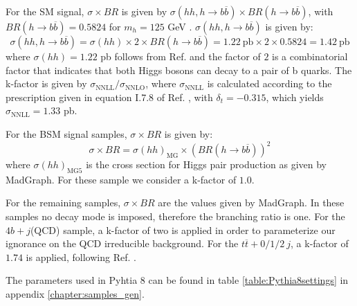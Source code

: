 For the SM signal, $\sigma\times BR$ is given by $\sigma(hh,h\rightarrow b\overline{b})\times BR(h\rightarrow b\overline{b})$, with $BR(h\rightarrow b\overline{b})=0.5824$ for $m_h=125$ GeV \cite{HiggsHandbook}. $\sigma(hh,h\rightarrow b\overline{b})$ is given by:
\begin{equation}
	\sigma(hh,h\rightarrow b\overline{b})=\sigma(hh)\times 2\times BR(h\rightarrow b\overline{b})=1.22~\text{pb}\times 2 \times 0.5824 = 1.42 ~\text{pb}
\end{equation}
where $\sigma(hh)=1.22$ pb follows from Ref. \cite{HxsNNLO} and the factor of $2$ is a combinatorial factor that indicates that both Higgs bosons can decay to a pair of b quarks. The k-factor is given by $\sigma_{\text{NNLL}}/\sigma_{\text{NNLO}}$, where $\sigma_{\text{NNLL}}$ is calculated according to the prescription given in equation I.7.8 of Ref. \cite{HiggsHandbook}, with $\delta_t=-0.315$, which yields $\sigma_{\text{NNLL}}=1.33$ pb.

For the BSM signal samples, $\sigma\times BR$ is given by:
\begin{equation}
	\sigma\times BR = \sigma(hh)_{\text{MG}}\times (BR(h\rightarrow b\overline{b}))^2
\end{equation}
where $\sigma(hh)_{\text{MG5}}$ is the cross section for Higgs pair production as given by MadGraph. For these sample we consider a k-factor of $1.0$.

For the remaining samples, $\sigma\times BR$ are the values given by MadGraph. In these samples no decay mode is imposed, therefore the branching ratio is one. For the $4b+j$(QCD) sample, a k-factor of two is applied \cite{FCCEventProducer} in order to parameterize our ignorance on the QCD irreducible background. For the $t\overline{t}+0/1/2 ~j$, a k-factor of $1.74$ is applied, following Ref. \cite{FCCEventProducer}.

The parameters used in Pyhtia 8 can be found in table \ref{table:Pythia8settings} in appendix \ref{chapter:samples_gen}.

